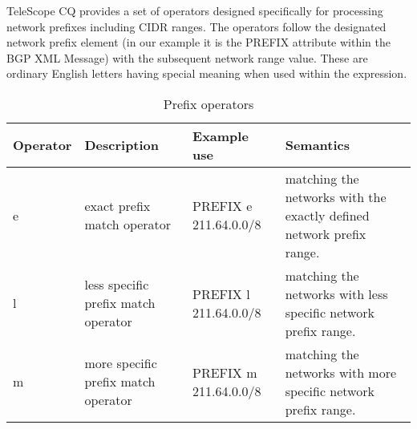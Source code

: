 \documentclass[11pt]{article} %
\begin{document}



TeleScope CQ provides a set of operators designed specifically for processing network prefixes including CIDR ranges.  The operators follow the designated network prefix element (in our example it is the PREFIX attribute within the BGP XML Message) with the subsequent network range value. These are ordinary English letters having special meaning when used within the expression\label{table:prefix operators}.
\begin{table}[ht] 
\caption{Prefix operators } %
\centering      %
\begin{tabular} %
{ | l | l | l | p{5cm} |}
\hline\hline                        %
Operator & Description & Example use & Semantics \\ [0.25ex] %
\hline                    %
e  & exact prefix match operator & PREFIX e 211.64.0.0/8 & matching the networks with the exactly defined network prefix range. \\ \hline

l  & less specific prefix match operator & PREFIX l 211.64.0.0/8 & matching the networks with less specific network prefix range. \\ \hline

m & more specific prefix match operator & PREFIX m 211.64.0.0/8 & matching the networks with more specific network prefix range.  \\ \hline
\end{tabular} 
\label{table:prefix operators}  %
\end{table} 


\end{document}
